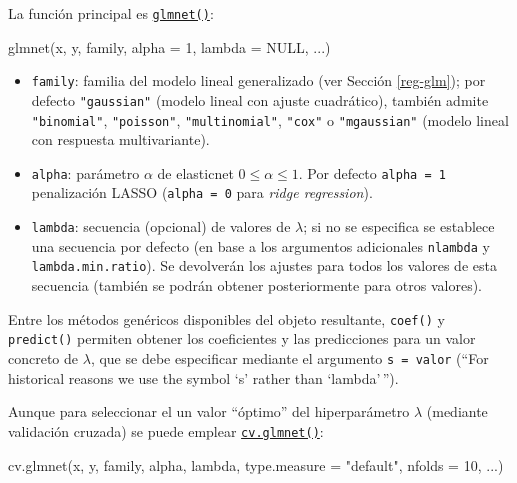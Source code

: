 \documentclass[
]{book}
\newenvironment{Shaded}{\begin{snugshade}}{\end{snugshade}}
\newcommand{\AttributeTok}[1]{\textcolor[rgb]{0.77,0.63,0.00}{#1}}
\newcommand{\ConstantTok}[1]{\textcolor[rgb]{0.00,0.00,0.00}{#1}}
\newcommand{\DecValTok}[1]{\textcolor[rgb]{0.00,0.00,0.81}{#1}}
\newcommand{\FunctionTok}[1]{\textcolor[rgb]{0.00,0.00,0.00}{#1}}
\newcommand{\NormalTok}[1]{#1}
\newcommand{\StringTok}[1]{\textcolor[rgb]{0.31,0.60,0.02}{#1}}
\theoremstyle{break}
\theoremstyle{nonumberplain}
\begin{document}
La función principal es \href{https://glmnet.stanford.edu/reference/glmnet.html}{\texttt{glmnet()}}:

\begin{Shaded}
\begin{Highlighting}[]
\FunctionTok{glmnet}\NormalTok{(x, y, family, }\AttributeTok{alpha =} \DecValTok{1}\NormalTok{, }\AttributeTok{lambda =} \ConstantTok{NULL}\NormalTok{, ...)}
\end{Highlighting}
\end{Shaded}

\begin{itemize}
\item
  \texttt{family}: familia del modelo lineal generalizado (ver Sección \ref{reg-glm}); por defecto \texttt{"gaussian"} (modelo lineal con ajuste cuadrático), también admite \texttt{"binomial"}, \texttt{"poisson"}, \texttt{"multinomial"}, \texttt{"cox"} o \texttt{"mgaussian"} (modelo lineal con respuesta multivariante).
\item
  \texttt{alpha}: parámetro \(\alpha\) de elasticnet \(0 \leq \alpha \leq 1\). Por defecto \texttt{alpha\ =\ 1} penalización LASSO (\texttt{alpha\ =\ 0} para \emph{ridge regression}).
\item
  \texttt{lambda}: secuencia (opcional) de valores de \(\lambda\); si no se especifica se establece una secuencia por defecto (en base a los argumentos adicionales \texttt{nlambda} y \texttt{lambda.min.ratio}). Se devolverán los ajustes para todos los valores de esta secuencia (también se podrán obtener posteriormente para otros valores).
\end{itemize}

Entre los métodos genéricos disponibles del objeto resultante, \texttt{coef()} y \texttt{predict()} permiten obtener los coeficientes y las predicciones para un valor concreto de \(\lambda\), que se debe especificar mediante el argumento \texttt{s\ =\ valor} (``For historical reasons we use the symbol `s' rather than `lambda'\,'').

Aunque para seleccionar el un valor ``óptimo'' del hiperparámetro \(\lambda\) (mediante validación cruzada) se puede emplear \href{https://glmnet.stanford.edu/reference/cv.glmnet.html}{\texttt{cv.glmnet()}}:

\begin{Shaded}
\begin{Highlighting}[]
\FunctionTok{cv.glmnet}\NormalTok{(x, y, family, alpha, lambda, }\AttributeTok{type.measure =} \StringTok{"default"}\NormalTok{, }\AttributeTok{nfolds =} \DecValTok{10}\NormalTok{, ...)}
\end{Highlighting}
\end{Shaded}
\end{document}
